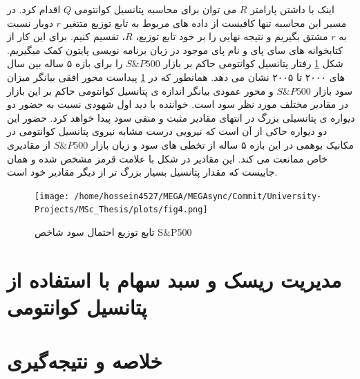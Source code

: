 \documentclass[a4paper,titlepage,12pt,fleqn,oneside]{report}
\begin{document}
\newpage
اینک با داشتن پارامتر $R$ می توان برای محاسبه پتانسیل کوانتومی $Q$ اقدام کرد.  در مسیر این محاسبه تنها کافیست از داده های مربوط به تابع توزیع متتغیر $r$ دوبار نسبت به $r$ مشتق بگیریم و نتیجه نهایی را بر خود تابع توزیع، $R$، تقسیم کنیم. برای این کار از کتابخوانه های سای پای و نام پای موجود در زبان برنامه نویسی پایتون کمک میگیریم. شکل
\ref{fig:4}
رفتار پتانسیل کوانتومی حاکم بر بازار 
$S\&P500$
را برای بازه ۵ ساله بین سال های ۲۰۰۰ تا ۲۰۰۵ نشان می دهد. همانطور که در 
\ref{fig:4}
پیداست محور افقی بیانگر میزان سود بازار
$S\&P500$
و محور عمودی بیانگر اندازه ی پتانسیل کوانتومی حاکم بر این بازار در مقادیر مختلف مورد نظر سود است. خواننده با دید اول شهودی نسبت به حضور دو دیواره ی پتانسیلی بزرگ در انتهای مقادیر مثبت و منفی سود پیدا خواهد کرد. حضور این دو دیواره حاکی از آن است که نیرویی درست مشابه نیروی پتانسیل کوانتومی در مکانیک بوهمی در این بازه ۵ ساله از تخطی های سود و زیان بازار 
$S\&P500$
از مقادیری خاص ممانعت می کند. این مقادیر در شکل با علامت قرمز مشخص شده و همان جاییست که مقدار پتانسیل بسیار بزرگ تر از دیگر مقادیر خود است.

\begin{figure}[ptb]
	\centering
	\texttt{[image: /home/hossein4527/MEGA/MEGAsync/Commit/University-Projects/MSc\_Thesis/plots/fig4.png]}
	\caption{تابع توزیع احتمال سود شاخص S\&P500}
	\label{fig:4}
\end{figure}
\chapter{مدیریت ریسک و  سبد سهام با استفاده از پتانسیل کوانتومی}




\chapter{خلاصه و نتیجه‌گیری}
\end{document}
